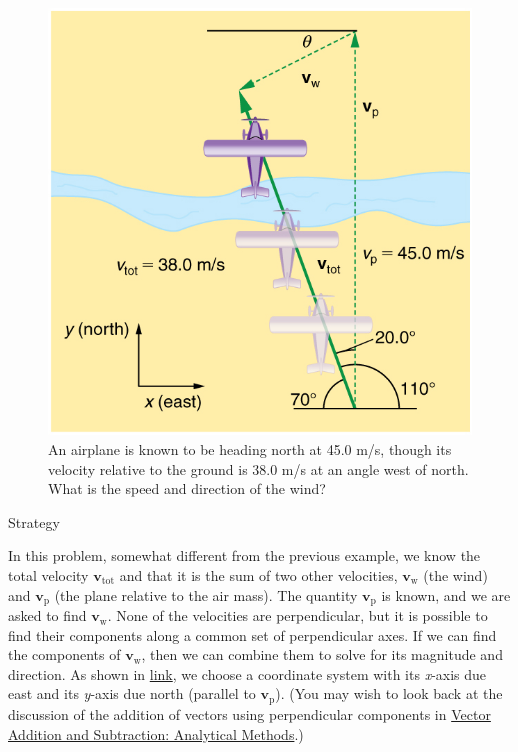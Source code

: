 \documentclass[
]{book}
\begin{document}
\begin{figure}
\hypertarget{import-auto-id1546060}{%
\centering
\includegraphics{images/Figure_03_05_04a.jpg}
\caption{An airplane is known to be heading north at 45.0 m/s, though its
velocity relative to the ground is 38.0 m/s at an angle west of north.
What is the speed and direction of the
wind?}\label{import-auto-id1546060}
}
\end{figure}

{Strategy}

In this problem, somewhat different from the previous example, we know
the total velocity \(\textbf{v}_{\text{tot}}\) and that it is the sum of
two other velocities, \(\textbf{v}_{\text{w}}{}\) (the wind) and
\(\textbf{v}_{\text{p}}{}\) (the plane relative to the air mass). The
quantity \(\textbf{v}_{\text{p}}{}\) is known, and we are asked to find
\(\textbf{v}_{\text{w}}{}\). None of the velocities are perpendicular, but
it is possible to find their components along a common set of
perpendicular axes. If we can find the components of
\(\textbf{v}_{\text{w}}{}\), then we can combine them to solve for its
magnitude and direction. As shown in
\protect\hyperlink{import-auto-id1546060}{link}, we choose a
coordinate system with its \emph{x}-axis due east and its \emph{y}-axis due north
(parallel to \(\textbf{v}_{\text{p}}{}\)). (You may wish to look back at
the discussion of the addition of vectors using perpendicular components
in \href{/m54783}{Vector Addition and Subtraction: Analytical Methods}.)
\end{document}
